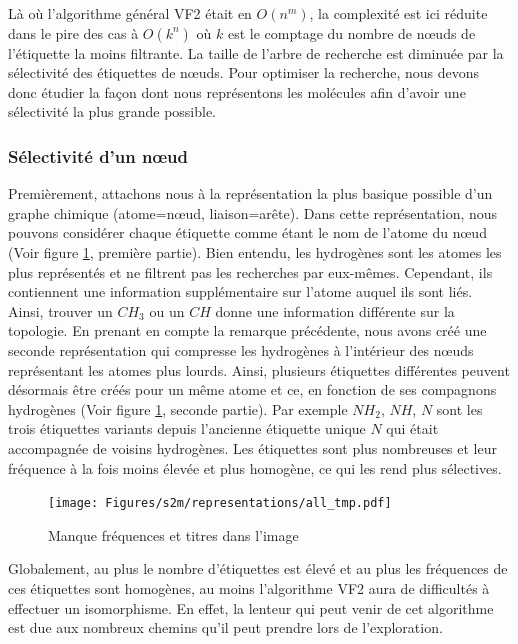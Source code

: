 Là où l'algorithme général VF2 était en $O(n^m)$, la complexité est ici réduite dans le pire des cas à $O(k^n)$ où $k$ est le comptage du nombre de n\oe{}uds de l'étiquette la moins filtrante.
La taille de l'arbre de recherche est diminuée par la sélectivité des étiquettes de n\oe{}uds.
Pour optimiser la recherche, nous devons donc étudier la façon dont nous représentons les molécules afin d'avoir une sélectivité
la plus grande possible.

\subsubsection{Sélectivité d'un n\oe{}ud}

\label{selectiv_p}

Premièrement, attachons nous à la représentation la plus basique possible d'un graphe chimique (atome=n\oe{}ud, liaison=arête).
Dans cette représentation, nous pouvons considérer chaque étiquette comme étant le nom de l'atome du n\oe{}ud (Voir figure \ref{representations}, première partie).
Bien entendu, les hydrogènes sont les atomes les plus représentés et ne filtrent pas les recherches par eux-mêmes.
Cependant, ils contiennent une information supplémentaire sur l'atome auquel ils sont liés.
Ainsi, trouver un $CH_{3}$ ou un $CH$ donne une information différente sur la topologie.
En prenant en compte la remarque précédente, nous avons créé une seconde représentation qui compresse les hydrogènes à l'intérieur des n\oe{}uds représentant les atomes plus lourds.
Ainsi, plusieurs étiquettes différentes peuvent désormais être créés pour un même atome et ce, en fonction de ses compagnons hydrogènes (Voir figure \ref{representations}, seconde partie).
Par exemple $NH_2$, $NH$, $N$ sont les trois étiquettes variants depuis l'ancienne étiquette unique $N$ qui était accompagnée de voisins hydrogènes.
Les étiquettes sont plus nombreuses et leur fréquence à la fois moins élevée et plus homogène, ce qui les rend plus sélectives.

\begin{figure}[!ht]
  \texttt{[image: Figures/s2m/representations/all\_tmp.pdf]}
  \caption{\label{representations}Manque fréquences et titres dans l'image}
\end{figure}

Globalement, au plus le nombre d'étiquettes est élevé et au plus les fréquences de ces étiquettes sont homogènes, au moins l'algorithme VF2 aura de difficultés à effectuer un isomorphisme.
En effet, la lenteur qui peut venir de cet algorithme est due aux nombreux chemins qu'il
peut prendre lors de l'exploration.

